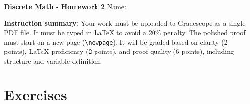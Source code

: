 \documentclass[12pt]{article}
\begin{document}
\begin{center}
 \LARGE{ \textbf{Discrete Math - Homework 2}} \Large \newline
    Name:
\end{center}

\vspace{1em}

\noindent \textbf{Instruction summary:} Your work must be uploaded to Gradescope as a single PDF file. It must be typed in LaTeX to avoid a 20\% penalty. The polished proof must start on a new page (\texttt{\textbackslash newpage}). It will be graded based on clarity (2 points), LaTeX proficiency (2 points), and proof quality (6 points), including structure and variable definition.

\section*{Exercises}
\end{document}
